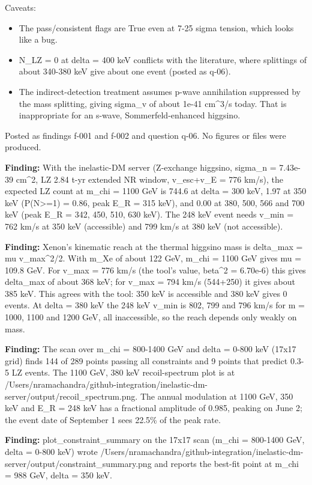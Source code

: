 \documentclass[11pt,a4paper]{article}
\begin{document}
Caveats:

\begin{itemize}
  \item The pass/consistent flags are True even at 7-25 sigma tension, which looks like a bug.
  \item N\_LZ = 0 at delta = 400 keV conflicts with the literature, where splittings of about 340-380 keV give about one event (posted as q-06).
  \item The indirect-detection treatment assumes p-wave annihilation suppressed by the mass splitting, giving sigma\_v of about 1e-41 cm\textasciicircum{}3/s today. That is inappropriate for an s-wave, Sommerfeld-enhanced higgsino.
\end{itemize}
Posted as findings f-001 and f-002 and question q-06. No figures or files were produced.

\textbf{Finding:} With the inelastic-DM server (Z-exchange higgsino, sigma\_n = 7.43e-39 cm\textasciicircum{}2, LZ 2.84 t-yr extended NR window, v\_esc+v\_E = 776 km/s), the expected LZ count at m\_chi = 1100 GeV is 744.6 at delta = 300 keV, 1.97 at 350 keV (P(N\textgreater{}=1) = 0.86, peak E\_R = 315 keV), and 0.00 at 380, 500, 566 and 700 keV (peak E\_R = 342, 450, 510, 630 keV). The 248 keV event needs v\_min = 762 km/s at 350 keV (accessible) and 799 km/s at 380 keV (not accessible).

\textbf{Finding:} Xenon's kinematic reach at the thermal higgsino mass is delta\_max = mu v\_max\textasciicircum{}2/2. With m\_Xe of about 122 GeV, m\_chi = 1100 GeV gives mu = 109.8 GeV. For v\_max = 776 km/s (the tool's value, beta\textasciicircum{}2 = 6.70e-6) this gives delta\_max of about 368 keV; for v\_max = 794 km/s (544+250) it gives about 385 keV. This agrees with the tool: 350 keV is accessible and 380 keV gives 0 events. At delta = 380 keV the 248 keV v\_min is 802, 799 and 796 km/s for m = 1000, 1100 and 1200 GeV, all inaccessible, so the reach depends only weakly on mass.

\textbf{Finding:} The scan over m\_chi = 800-1400 GeV and delta = 0-800 keV (17x17 grid) finds 144 of 289 points passing all constraints and 9 points that predict 0.3-5 LZ events. The 1100 GeV, 380 keV recoil-spectrum plot is at /Users/nramachandra/github-integration/inelastic-dm-server/output/recoil\_spectrum.png. The annual modulation at 1100 GeV, 350 keV and E\_R = 248 keV has a fractional amplitude of 0.985, peaking on June 2; the event date of September 1 sees 22.5\% of the peak rate.

\textbf{Finding:} plot\_constraint\_summary on the 17x17 scan (m\_chi = 800-1400 GeV, delta = 0-800 keV) wrote /Users/nramachandra/github-integration/inelastic-dm-server/output/constraint\_summary.png and reports the best-fit point at m\_chi = 988 GeV, delta = 350 keV.
\end{document}
